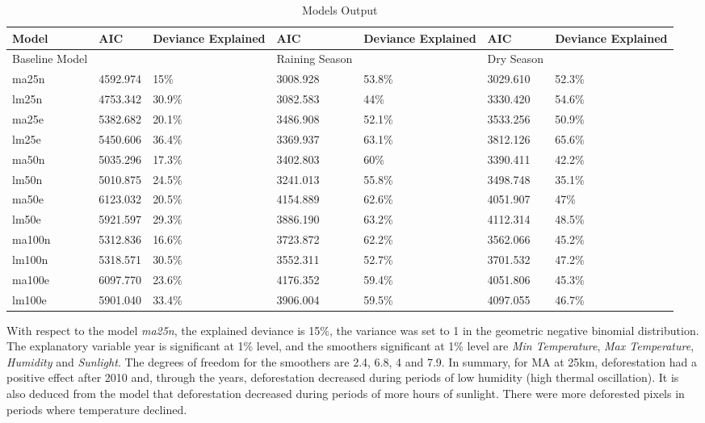 \begin{landscape}
\begin{table}[H]
\footnotesize
\caption{Models Output}
\begin{tabularx}{0.85\linewidth}{lxxxxxx}
\hline
\hline
Model  & AIC &   Deviance Explained &  AIC &   Deviance Explained & AIC &   Deviance Explained\\
\hline
Baseline Model & & & Raining Season &  &  Dry Season &    &\\
\hline
ma25n & 4592.974 & 15\% & 3008.928 & 53.8\%  & 3029.610 & 52.3\% \\
lm25n & 4753.342 & 30.9\% & 3082.583 & 44\% & 3330.420 & 54.6\% \\
ma25e & 5382.682 & 20.1\% & 3486.908 & 52.1\% & 3533.256 & 50.9\%\\
lm25e & 5450.606 & 36.4\% & 3369.937 & 63.1\% & 3812.126 & 65.6\%\\
ma50n & 5035.296 & 17.3\% & 3402.803 & 60\% & 3390.411 & 42.2\%\\
lm50n & 5010.875 & 24.5\% & 3241.013 & 55.8\% & 3498.748 & 35.1\%\\
ma50e & 6123.032 & 20.5\% & 4154.889 & 62.6\% & 4051.907 & 47\%\\
lm50e & 5921.597 & 29.3\% & 3886.190 & 63.2\%& 4112.314 & 48.5\%\\
ma100n & 5312.836 & 16.6\% & 3723.872 & 62.2\%& 3562.066 & 45.2\%\\
lm100n & 5318.571 & 30.5\% & 3552.311 & 52.7\% & 3701.532 & 47.2\%\\
ma100e & 6097.770 & 23.6\% & 4176.352 & 59.4\% & 4051.806 & 45.3\% \\
lm100e & 5901.040 & 33.4\% & 3906.004 & 59.5\% & 4097.055 & 46.7\% \\
\hline
\hline
\end{tabularx}
\label{results1}
\end{table}
\end{landscape}

With respect to the model \textit{ma25n}, the explained deviance is 15\%, the variance was set to 1 in the geometric negative binomial distribution. The explanatory variable year is significant at 1\% level, and the smoothers significant at 1\% level are \textit{Min Temperature}, \textit{Max Temperature}, \textit{Humidity} and \textit{Sunlight}. The degrees of freedom for the smoothers are 2.4, 6.8, 4 and 7.9. In summary, for MA at 25km, deforestation had a positive effect after 2010 and, through the years, deforestation decreased during periods of low humidity (high thermal oscillation). It is also deduced from the model that deforestation decreased during periods of more hours of sunlight. There were more deforested pixels in periods where temperature declined. 

